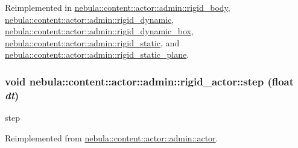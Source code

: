 Reimplemented in \hyperlink{classnebula_1_1content_1_1actor_1_1admin_1_1rigid__body_ab0ed9e145b42efdd0049e2e1ef7d5da4}{nebula::content::actor::admin::rigid\_\-body}, \hyperlink{classnebula_1_1content_1_1actor_1_1admin_1_1rigid__dynamic_a6b7e8768902a320d8f7f483cf348a059}{nebula::content::actor::admin::rigid\_\-dynamic}, \hyperlink{classnebula_1_1content_1_1actor_1_1admin_1_1rigid__dynamic__box_af3ecd05192435e30fbe258f243d18adc}{nebula::content::actor::admin::rigid\_\-dynamic\_\-box}, \hyperlink{classnebula_1_1content_1_1actor_1_1admin_1_1rigid__static_a813d55717971528046af12804e01ff4e}{nebula::content::actor::admin::rigid\_\-static}, and \hyperlink{classnebula_1_1content_1_1actor_1_1admin_1_1rigid__static__plane_a40139ed218560b51d64612559be0564d}{nebula::content::actor::admin::rigid\_\-static\_\-plane}.\hypertarget{classnebula_1_1content_1_1actor_1_1admin_1_1rigid__actor_aba5200b2e542e3f0433c89ef026c5673}{
\subsubsection[{step}]{\setlength{\rightskip}{0pt plus 5cm}void nebula::content::actor::admin::rigid\_\-actor::step (float {\em dt})}}
\label{classnebula_1_1content_1_1actor_1_1admin_1_1rigid__actor_aba5200b2e542e3f0433c89ef026c5673}


step 

Reimplemented from \hyperlink{classnebula_1_1content_1_1actor_1_1admin_1_1actor_af4b68cdf9481cd0ad5f56a78bb691997}{nebula::content::actor::admin::actor}.

